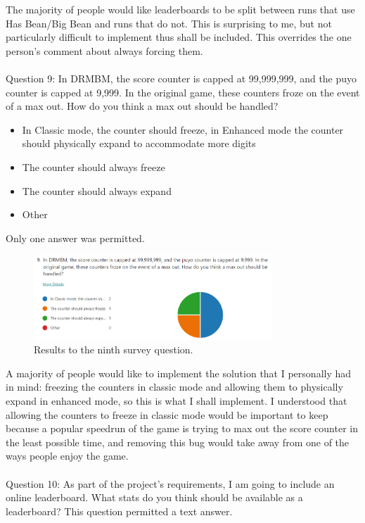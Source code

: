 \documentclass{article}
\begin{document}
The majority of people would like leaderboards to be split between runs that use Has Bean/Big Bean and runs that do not. This is surprising to me, but not particularly difficult to implement thus shall be included. This overrides the one person's comment about always forcing them.
\\\\
Question 9: In DRMBM, the score counter is capped at 99,999,999, and the puyo counter is capped at 9,999. In the original game, these counters froze on the event of a max out. How do you think a max out should be handled?
\begin{itemize}
    \renewcommand\labelitemi{--}
    \item In Classic mode, the counter should freeze, in Enhanced mode the counter should physically expand to accommodate more digits
    \item The counter should always freeze
    \item The counter should always expand
    \item Other
\end{itemize}
Only one answer was permitted.

\begin{figure}[h]
    \centering
    \includegraphics[width=0.8\textwidth]{survey9.png}
    \caption{\label{fig:survey9}Results to the ninth survey question.}
\end{figure}

A majority of people would like to implement the solution that I personally had in mind: freezing the counters in classic mode and allowing them to physically expand in enhanced mode, so this is what I shall implement. I understood that allowing the counters to freeze in classic mode would be important to keep because a popular speedrun of the game is trying to max out the score counter in the least possible time, and removing this bug would take away from one of the ways people enjoy the game.
\\\\
Question 10: As part of the project's requirements, I am going to include an online leaderboard. What stats do you think should be available as a leaderboard?
This question permitted a text answer.
\end{document}
